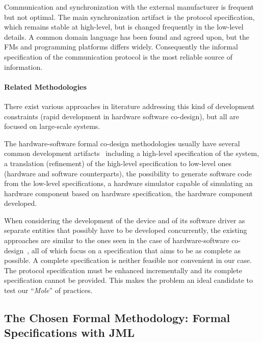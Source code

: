 \documentclass[english]{lni}
\newcommand{\mole}{``\emph{Mole}''\xspace}
\begin{document}
Communication and synchronization with the external manufacturer is frequent but not optimal.  
The main synchronization artifact is the protocol specification, which remains stable at high-level, but is changed frequently in the low-level details.  
A common domain language has been found and agreed upon, but the FMs and programming platforms differs widely.  
Consequently the informal specification of the communication protocol is the most reliable source of information.



\paragraph*{Related Methodologies}

There exist various approaches in literature addressing this kind of development constraints (rapid development in hardware software co-design), but all are focused on large-scale systems.  

The hardware-software formal co-design methodologies usually have several common development artifacts~\cite{Slomka2000, Hoffman2001} including a high-level specification of the system, a translation (refinement) of the high-level specification to low-level ones (hardware and software counterparts), the possibility to generate software code from the low-level specifications, a hardware simulator capable of simulating an hardware component based on hardware specification, the hardware component developed.

When considering the development of the device and of its software driver as separate entities that possibly have to be developed concurrently, the existing approaches are similar to the ones seen in the case of hardware-software co-design~\cite{Valderrama1995,Siegmund2002,Ryzhyk2009}, all of which focus on a specification that aims to be as complete as possible.
A complete specification is neither feasible nor convenient in our case. 
The protocol specification must be enhanced incrementally and its complete specification cannot be provided.  
This makes the problem an ideal candidate to test our \mole of practices.



\subsection{The Chosen Formal Methodology: Formal Specifications with JML}
\end{document}
